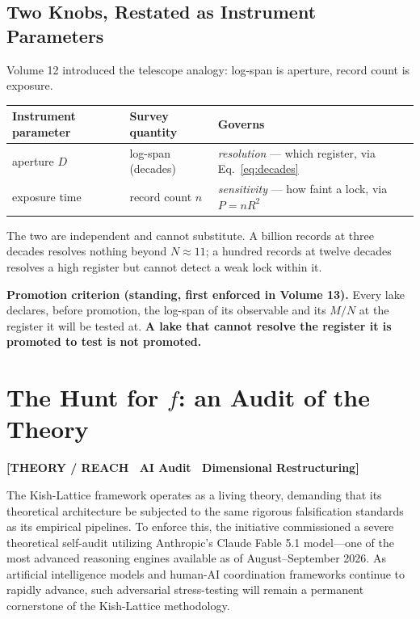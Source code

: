 \documentclass[11pt, letterpaper, openany]{book}
\newcommand{\MN}{M/N}
\begin{document}
\section{Two Knobs, Restated as Instrument Parameters}

Volume 12 introduced the telescope analogy: log-span is aperture, record count is exposure.

\begin{table}[H]
\centering
\small
\begin{tabular}{@{}lll@{}}
\toprule
\textbf{Instrument parameter} & \textbf{Survey quantity} & \textbf{Governs} \\
\midrule
aperture $D$ & log-span (decades) & \emph{resolution} --- which register, via Eq.~\ref{eq:decades} \\
exposure time & record count $n$ & \emph{sensitivity} --- how faint a lock, via $P = nR^2$ \\
\bottomrule
\end{tabular}
\end{table}

The two are independent and cannot substitute. A billion records at three decades resolves
nothing beyond $N \approx 11$; a hundred records at twelve decades resolves a high register but
cannot detect a weak lock within it. 

\begin{predictionbox}
\textbf{Promotion criterion (standing, first enforced in Volume 13).} Every lake declares, before
promotion, the log-span of its observable and its $\MN$ at the register it will be tested at. \textbf{A lake that cannot resolve the register it is
promoted to test is not promoted.}
\end{predictionbox}

\chapter{The Hunt for $f$: an Audit of the Theory}

\begin{center}
{\color{theorytag}\textbf{[THEORY / REACH \textbullet\ AI Audit \textbullet\ Dimensional Restructuring]}}
\end{center}

The Kish-Lattice framework operates as a living theory, demanding that its theoretical architecture be subjected to the same rigorous falsification standards as its empirical pipelines. To enforce this, the initiative commissioned a severe theoretical self-audit utilizing Anthropic's Claude Fable 5.1 model—one of the most advanced reasoning engines available as of August--September 2026. As artificial intelligence models and human-AI coordination frameworks continue to rapidly advance, such adversarial stress-testing will remain a permanent cornerstone of the Kish-Lattice methodology. 
\end{document}
